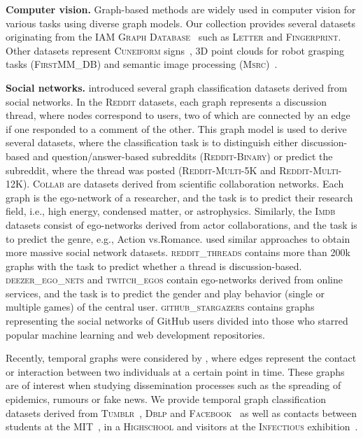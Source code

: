 \documentclass{article}
\newcommand{\xhdr}[1]{{\noindent\bfseries #1}}
\theoremstyle{definition}
\begin{document}
\xhdr{Computer vision.}
Graph-based methods are widely used in computer vision for various tasks using diverse graph models. Our collection provides several datasets originating from the \textsc{IAM Graph Database}~\citep{Riesen2008} such as \textsc{Letter} and \textsc{Fingerprint}. Other datasets represent \textsc{Cuneiform} signs~\citep{Kriege2018}, 3D point clouds for robot grasping tasks (\textsc{FirstMM\_DB}) and semantic image processing (\textsc{Msrc})~\cite{Neu+2016}.

\xhdr{Social networks.}
\citet{Yan+2015a} introduced several graph classification datasets derived from social networks. In the \textsc{Reddit} datasets, each graph represents a discussion thread, where nodes correspond to users, two of which are connected by an edge if one responded to a comment of the other. This graph model is used to derive several datasets, where the classification task is to distinguish either discussion-based and question/answer-based subreddits (\textsc{Reddit-Binary}) or predict the subreddit, where the thread was posted (\textsc{Reddit-Multi-5K} and \textsc{Reddit-Multi-12K}). \textsc{Collab} are datasets derived from scientific collaboration networks. Each graph is the ego-network of a researcher, and the task is to predict their research field, i.e., high energy, condensed matter, or astrophysics. Similarly, the \textsc{Imdb} datasets consist of ego-networks derived from actor collaborations, and the task is to predict the genre, e.g.,  Action vs.\@ Romance.
\citet{Rozemberczki2020} used similar approaches to obtain more massive social network datasets. \textsc{reddit\_threads} contains more than 200k graphs with the task to predict whether a thread is discussion-based. \textsc{deezer\_ego\_nets} and \textsc{twitch\_egos} contain ego-networks derived from online services, and the task is to predict the gender and play behavior (single or multiple games) of the central user.
\textsc{github\_stargazers} contains graphs representing the social networks of GitHub users divided into those who starred popular machine learning and web development repositories.


Recently, temporal graphs were considered by \citet{Oettershagen2019}, where edges represent the contact or interaction between two individuals at a certain point in time. These graphs are of interest when studying dissemination processes such as the spreading of epidemics, rumours or fake news. We provide temporal graph classification datasets derived from \textsc{Tumblr}~\citep{rozenshtein2016reconstructing}, \textsc{Dblp} and \textsc{Facebook}~\citep{viswanath2009evolution} as well as contacts between students at the \textsc{MIT}~\cite{konect:eagle06}, in a \textsc{Highschool} and visitors at the \textsc{Infectious} exhibition~\citep{Isella2011}.
\end{document}
